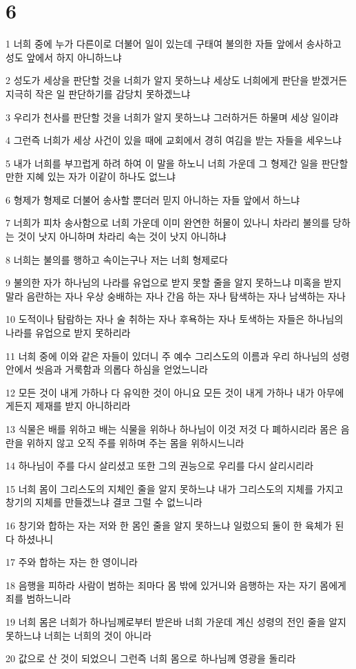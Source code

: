 \chapter{6}

\par 1 너희 중에 누가 다른이로 더불어 일이 있는데 구태여 불의한 자들 앞에서 송사하고 성도 앞에서 하지 아니하느냐
\par 2 성도가 세상을 판단할 것을 너희가 알지 못하느냐 세상도 너희에게 판단을 받겠거든 지극히 작은 일 판단하기를 감당치 못하겠느냐
\par 3 우리가 천사를 판단할 것을 너희가 알지 못하느냐 그러하거든 하물며 세상 일이랴
\par 4 그런즉 너희가 세상 사건이 있을 때에 교회에서 경히 여김을 받는 자들을 세우느냐
\par 5 내가 너희를 부끄럽게 하려 하여 이 말을 하노니 너희 가운데 그 형제간 일을 판단할만한 지혜 있는 자가 이같이 하나도 없느냐
\par 6 형제가 형제로 더불어 송사할 뿐더러 믿지 아니하는 자들 앞에서 하느냐
\par 7 너희가 피차 송사함으로 너희 가운데 이미 완연한 허물이 있나니 차라리 불의를 당하는 것이 낫지 아니하며 차라리 속는 것이 낫지 아니하냐
\par 8 너희는 불의를 행하고 속이는구나 저는 너희 형제로다
\par 9 불의한 자가 하나님의 나라를 유업으로 받지 못할 줄을 알지 못하느냐 미혹을 받지 말라 음란하는 자나 우상 숭배하는 자나 간음 하는 자나 탐색하는 자나 남색하는 자나
\par 10 도적이나 탐람하는 자나 술 취하는 자나 후욕하는 자나 토색하는 자들은 하나님의 나라를 유업으로 받지 못하리라
\par 11 너희 중에 이와 같은 자들이 있더니 주 예수 그리스도의 이름과 우리 하나님의 성령 안에서 씻음과 거룩함과 의롭다 하심을 얻었느니라
\par 12 모든 것이 내게 가하나 다 유익한 것이 아니요 모든 것이 내게 가하나 내가 아무에게든지 제재를 받지 아니하리라
\par 13 식물은 배를 위하고 배는 식물을 위하나 하나님이 이것 저것 다 폐하시리라 몸은 음란을 위하지 않고 오직 주를 위하며 주는 몸을 위하시느니라
\par 14 하나님이 주를 다시 살리셨고 또한 그의 권능으로 우리를 다시 살리시리라
\par 15 너희 몸이 그리스도의 지체인 줄을 알지 못하느냐 내가 그리스도의 지체를 가지고 창기의 지체를 만들겠느냐 결코 그럴 수 없느니라
\par 16 창기와 합하는 자는 저와 한 몸인 줄을 알지 못하느냐 일렀으되 둘이 한 육체가 된다 하셨나니
\par 17 주와 합하는 자는 한 영이니라
\par 18 음행을 피하라 사람이 범하는 죄마다 몸 밖에 있거니와 음행하는 자는 자기 몸에게 죄를 범하느니라
\par 19 너희 몸은 너희가 하나님께로부터 받은바 너희 가운데 계신 성령의 전인 줄을 알지 못하느냐 너희는 너희의 것이 아니라
\par 20 값으로 산 것이 되었으니 그런즉 너희 몸으로 하나님께 영광을 돌리라

